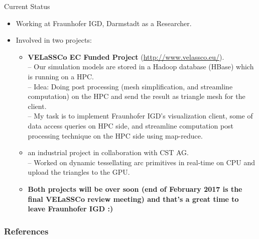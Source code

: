 \documentclass{beamer}
\begin{document}
\begin{frame}{Current Status}
	\begin{itemize}
		\item Working at Fraunhofer IGD, Darmstadt as a Researcher.
		\item Involved in two projects:
			\begin{itemize}
				\item \textbf{VELaSSCo EC Funded Project} (\url{http://www.velassco.eu/}).\\
				
				-- Our simulation models are stored in a Hadoop database (HBase) which is running on a HPC.\\
				-- Idea: Doing post processing (mesh simplification, and streamline computation) on the HPC and send the result as triangle mesh for the client.\\
				-- My task is to implement Fraunhofer IGD's visualization client, some of data access queries on HPC side, and streamline computation post processing technique on the HPC side using map-reduce.
				\item an industrial project in collaboration with CST AG.\\
				-- Worked on dynamic tessellating arc primitives in real-time on CPU and upload the triangles to the GPU.
				\item \textbf{Both projects will be over soon (end of February 2017 is the final VELaSSCo review meeting) and that's a great time to leave Fraunhofer IGD :)}
			\end{itemize}		
	\end{itemize}
\end{frame}

\begin{frame}[allowframebreaks]
	\frametitle{References}
	
	
\end{frame}
\end{document}
